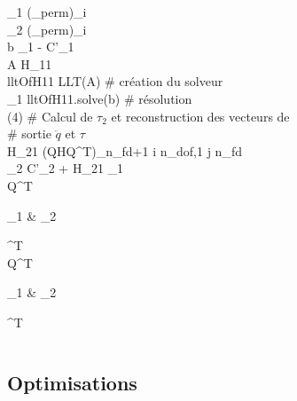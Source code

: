 \documentclass[10pt]{beamer}
\begin{document}
\begin{frame}
\begin{spacing}{1.5}
\begin{columns}[T]
\begin{column}{.48\textwidth}
\begin{pseudocode}{ }{ }
	  \tau_1 \GETS (\tau_{perm})_{i \in [1,fd]} \\
	  \tau_2 \GETS (\tau_{perm})_{i \in [fd+1,n_{dof}]} \\
	  b \GETS \tau_1 - C'_1 \\
	  A \GETS H_{11} \\
	  lltOfH11 \GETS LLT(A) \hfill \textnormal{\# création du solveur} \\
	  _1 \GETS lltOfH11.solve(b) \hfill \textnormal{\# résolution} 
	\END \\
	(4) 
	\BEGIN
	  \textnormal{\# Calcul de $\tau_2$ et reconstruction des vecteurs de} \\
	  \textnormal{\# sortie $\ddot{q}$ et $\tau$} \\
	   H_{21} \GETS (QHQ^T)_{n_{fd+1} \leqslant i \leqslant n_{dof},1 \leqslant j \leqslant n_{fd}} \\
	  \tau_2 \GETS C'_2 + H_{21} _1 \\
	  \tau \GETS Q^T \begin{bmatrix} \tau_1 & \tau_2 \end{bmatrix}^T \\
	   \GETS Q^T \begin{bmatrix} _1 & _2 \end{bmatrix}^T
	\END 
	\end{pseudocode}
	\end{column}
	\end{columns}
	\end{spacing}
  \vfill
	  
\end{frame}



\subsection{Optimisations}
\end{document}
